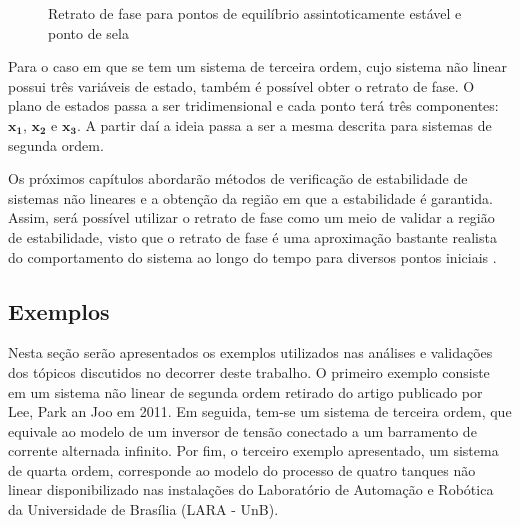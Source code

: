 \begin{figure}[htbp]
	\centering
	\qquad
	\caption{Retrato de fase para pontos de equilíbrio  assintoticamente estável e ponto de sela}
	\label{fig:outras_config_retrato_fase}
\end{figure}

Para o caso em que se tem um sistema de terceira ordem, cujo sistema não linear possui três variáveis de estado, também é possível obter o retrato de fase. O plano de estados passa a ser tridimensional e cada ponto terá três componentes: $\mathbf{x_1}$, $\mathbf{x_2}$ e $\mathbf{x_3}$. A partir daí a ideia passa a ser a mesma descrita para sistemas de segunda ordem.

Os próximos capítulos abordarão métodos de verificação de estabilidade de sistemas não lineares e a obtenção da região em que a estabilidade é garantida. Assim, será possível utilizar o retrato de fase como um meio de validar a região de estabilidade, visto que o retrato de fase é uma aproximação bastante realista do comportamento do sistema ao longo do tempo para diversos pontos iniciais \cite{bookkhalil:2003}.

\subsection{Exemplos} \label{subsection:descr_exemplos}

Nesta seção serão apresentados os exemplos utilizados nas análises e validações dos tópicos discutidos no decorrer deste trabalho. O primeiro exemplo consiste em um sistema não linear de segunda ordem retirado do artigo publicado por Lee, Park an Joo em 2011\cite{article:LPJ:2011}. Em seguida, tem-se um sistema de terceira ordem, que equivale ao modelo de um inversor de tensão conectado a um barramento de corrente alternada infinito. Por fim, o terceiro exemplo apresentado, um sistema  de quarta ordem, corresponde ao modelo do processo  de quatro tanques não linear disponibilizado nas instalações do Laboratório de Automação e Robótica da Universidade de Brasília (LARA - UnB).

